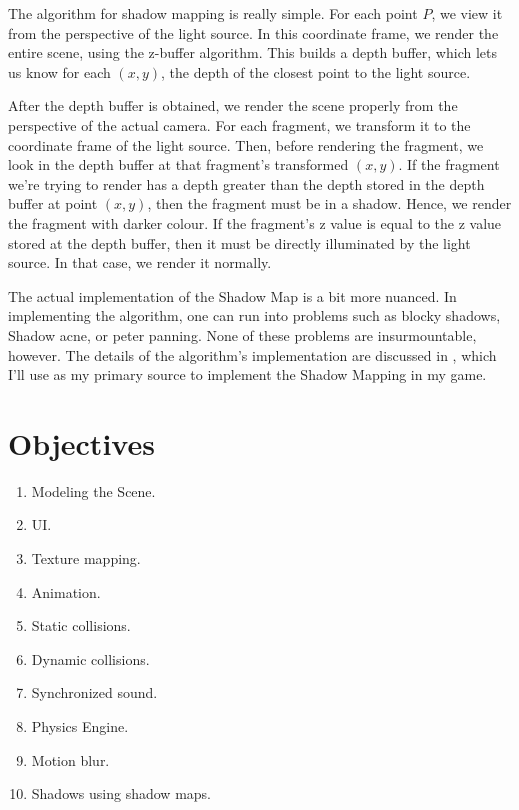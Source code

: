 \documentclass[11pt]{article}
\begin{document}
The algorithm for shadow mapping is really simple. For each point $P$, we view it from the perspective of the light source. In this coordinate frame, we render the entire scene, using the z-buffer algorithm. This builds a depth buffer, which lets us know for each $(x, y)$, the depth of the closest point to the light source.

After the depth buffer is obtained, we render the scene properly from the perspective of the actual camera. For each fragment, we transform it to the coordinate frame of the light source. Then, before rendering the fragment, we look in the depth buffer at that fragment's transformed $(x, y)$. If the fragment we're trying to render has a depth greater than the depth stored in the depth buffer at point $(x, y)$, then the fragment must be in a shadow. Hence, we render the fragment with darker colour. If the fragment's z value is equal to the z value stored at the depth buffer, then it must be directly illuminated by the light source. In that case, we render it normally.  

The actual implementation of the Shadow Map is a bit more nuanced. In implementing the algorithm, one can run into problems such as blocky shadows, Shadow acne, or peter panning. None of these problems are insurmountable, however. The details of the algorithm's implementation are discussed in \cite{shadow-map-learn-opengl}, which I'll use as my primary source to implement the Shadow Mapping in my game.

\printbibliography
\section*{Objectives}
\begin{enumerate}
\item Modeling the Scene.
\item UI.
\item Texture mapping.
\item Animation.
\item Static collisions.
\item Dynamic collisions.
\item Synchronized sound.
\item Physics Engine.
\item Motion blur.
\item Shadows using shadow maps.
\end{enumerate}
\end{document}

